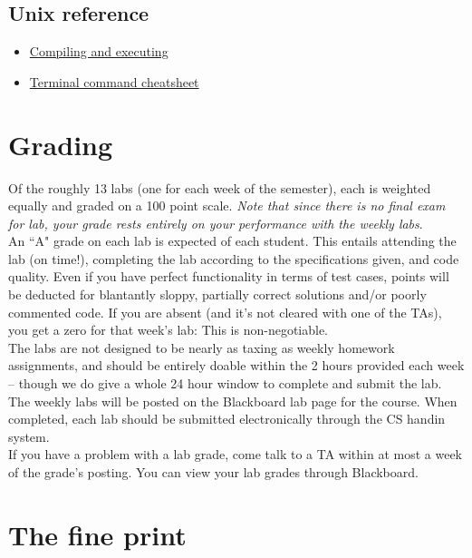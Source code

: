 \documentclass[12pt]{article}
\begin{document}
\subsection{Unix reference}

\begin{itemize}
\item \href{http://www.cs.clemson.edu/course/cpsc210/Links/compiling.html}{Compiling and executing}
\item \href{http://www.cs.clemson.edu/course/cpsc210/Links/unix.html}{Terminal command cheatsheet}

\end{itemize}
\section{Grading}

Of the roughly 13 labs (one for each week of the semester), each is weighted equally and graded on a 100 point scale. \textit{Note that since there is no final exam for lab, your grade rests entirely on your performance with the weekly labs}. \\

\noindent  An ``A" grade on each lab is expected of each student. This entails attending the lab (on time!), completing the lab according to the specifications given, and code quality. Even if you have perfect functionality in terms of test cases, points will be deducted for blantantly sloppy, partially correct solutions and/or poorly commented code. If you are absent (and it's not cleared with one of the TAs), you get a zero for that week's lab: This is non-negotiable. \\

\noindent The labs are not designed to be nearly as taxing as weekly homework assignments, and should be entirely doable within the 2 hours provided each week -- though we do give a whole 24 hour window to complete and submit the lab.\\

\noindent The weekly labs will be posted on the Blackboard lab page for the course. When completed, each lab should be submitted electronically through the CS handin system. \\

\noindent If you have a problem with a lab grade, come talk to a TA within at most a week of the grade's posting. You can view your lab grades through Blackboard.

\section{The fine print}
\end{document}
